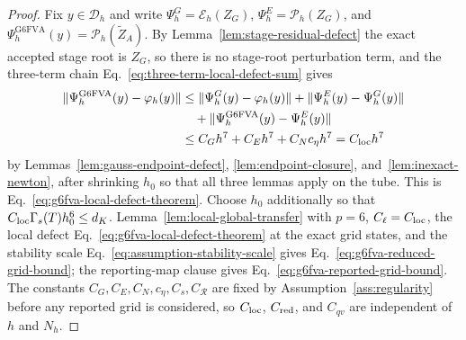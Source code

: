 \documentclass[preprint,12pt]{elsarticle}
\begin{document}
\begin{proof}
Fix $y\in\mathcal D_h$ and write $\Psi_h^G=\mathcal E_h(Z_G)$,
$\Psi_h^E=\mathcal P_h(Z_G)$, and
$\Psi_h^{\mathrm{G6FVA}}(y)=\mathcal P_h(\widetilde Z_A)$. By
Lemma~\ref{lem:stage-residual-defect} the exact accepted stage root is
$Z_G$, so there is no stage-root perturbation term, and the three-term chain
Eq.~\eqref{eq:three-term-local-defect-sum} gives
\begin{equation}
\label{eq:three-term-local-defect-sum}
\begin{aligned}
  \|\Psi_h^{\mathrm{G6FVA}}(y)-\varphi_h(y)\|
  &\le\|\Psi_h^G(y)-\varphi_h(y)\|
     +\|\Psi_h^E(y)-\Psi_h^G(y)\|\\
  &\quad+\|\Psi_h^{\mathrm{G6FVA}}(y)-\Psi_h^E(y)\|\\
  &\le C_Gh^7+C_Eh^7+C_Nc_\eta h^7=C_{\rm loc}h^7
\end{aligned}
\end{equation}
by Lemmas~\ref{lem:gauss-endpoint-defect}, \ref{lem:endpoint-closure},
and~\ref{lem:inexact-newton}, after shrinking $h_0$ so that all three lemmas
apply on the tube. This is Eq.~\eqref{eq:g6fva-local-defect-theorem}.
Choose $h_0$ additionally so that $C_{\rm loc}\Gamma_s(T)h_0^6\le d_K$.
Lemma~\ref{lem:local-global-transfer} with $p=6$, $C_\ell=C_{\rm loc}$, the
local defect Eq.~\eqref{eq:g6fva-local-defect-theorem} at the exact grid
states, and the stability scale Eq.~\eqref{eq:assumption-stability-scale}
gives Eq.~\eqref{eq:g6fva-reduced-grid-bound}; the reporting-map clause gives
Eq.~\eqref{eq:g6fva-reported-grid-bound}. The constants
$C_G,C_E,C_N,c_\eta,C_s,C_{\mathcal R}$ are fixed by
Assumption~\ref{ass:regularity} before any reported grid is considered, so
$C_{\rm loc}$, $C_{\rm red}$, and $C_{qv}$ are independent of $h$ and $N_h$.
\end{proof}
\end{document}

